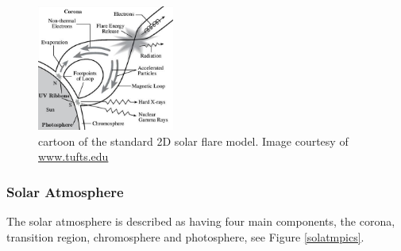 \begin{figure}[H]
  \begin{center}
  \includegraphics[width=0.40\textwidth]{flare}
  \caption{cartoon of the standard 2D solar flare model. Image courtesy of \href{http://ase.tufts.edu/cosmos/print_images.asp?id=47}{www.tufts.edu}}\label{flare-cartoon}
\end{center}
\end{figure}




\subsubsection{Solar Atmosphere}
The solar atmosphere is described as having four main components, the corona, transition region, chromosphere and photosphere, see Figure \ref{solatmpics}. 

